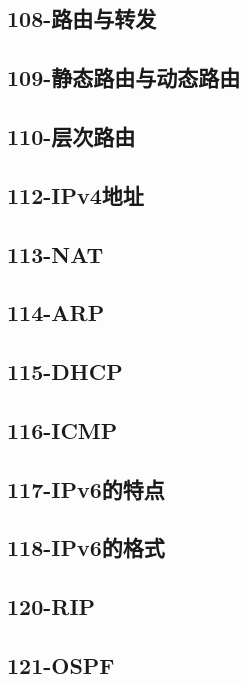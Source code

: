 \subsection{108-路由与转发}

\subsection{109-静态路由与动态路由}

\subsection{110-层次路由}

\subsection{112-IPv4地址}

\subsection{113-NAT}

\subsection{114-ARP}

\subsection{115-DHCP}

\subsection{116-ICMP}

\subsection{117-IPv6的特点}

\subsection{118-IPv6的格式}

\subsection{120-RIP}

\subsection{121-OSPF}

